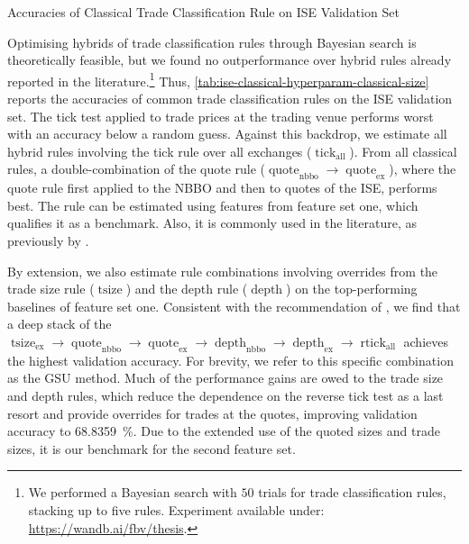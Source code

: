 \begin{table}[H]
    \centering
    \caption[Accuracies of Classical Trade Classification Rule on  Validation Set]{Accuracies of Classical Trade Classification Rule on \gls{ISE} Validation Set}
    \label{tab:ise-classical-hyperparam-classical-size}
    
\end{table}

Optimising hybrids of trade classification rules through Bayesian search is theoretically feasible, but we found no outperformance over hybrid rules already reported in the literature.\footnote{We performed a Bayesian search with $50$ trials for trade classification rules, stacking up to five rules. Experiment available under: \url{https://wandb.ai/fbv/thesis}.} Thus, \cref{tab:ise-classical-hyperparam-classical-size} reports the accuracies of common trade classification rules on the \gls{ISE} validation set. The tick test applied to trade prices at the trading venue performs worst with an accuracy below a random guess. Against this backdrop, we estimate all hybrid rules involving the tick rule over all exchanges ($\operatorname{tick}_{\mathrm{all}}$). From all classical rules, a double-combination of the quote rule ($\operatorname{quote}_{\mathrm{nbbo}} \to \operatorname{quote}_{\mathrm{ex}}$), where the quote rule first applied to the \gls{NBBO} and then to quotes of the \gls{ISE}, performs best. The rule can be estimated using features from feature set one, which qualifies it as a benchmark. Also, it is commonly used in the literature, as previously by \textcite[][]{muravyevOptionsTradingCosts2020}.

By extension, we also estimate rule combinations involving overrides from the trade size rule ($\operatorname{tsize}$) and the depth rule ($\operatorname{depth}$) on the top-performing baselines of feature set one. Consistent with the recommendation of \textcite[][14]{grauerOptionTradeClassification2022}, we find that a deep stack of the $\operatorname{tsize}_{\mathrm{ex}} \to \operatorname{quote}_{\mathrm{nbbo}} \to \operatorname{quote}_{\mathrm{ex}} \to \operatorname{depth}_{\mathrm{nbbo}} \to \operatorname{depth}_{\mathrm{ex}} \to \operatorname{rtick}_{\mathrm{all}}$ achieves the highest validation accuracy. For brevity, we refer to this specific combination as the \gls{GSU} method. Much of the performance gains are owed to the trade size and depth rules, which reduce the dependence on the reverse tick test as a last resort and provide overrides for trades at the quotes, improving validation accuracy to \SI{68.8359}{\percent}. Due to the extended use of the quoted sizes and trade sizes, it is our benchmark for the second feature set.

